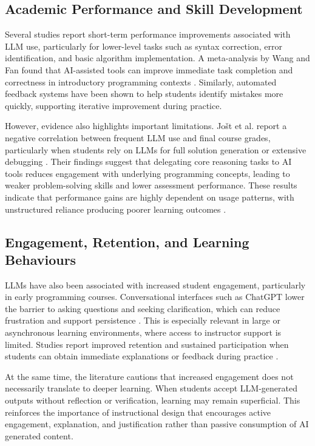 \documentclass[10pt,journal,compsoc]{IEEEtran}
\begin{document}
\subsection{Academic Performance and Skill Development}

Several studies report short-term performance improvements associated with LLM use, particularly for lower-level tasks such as syntax correction, error identification, and basic algorithm implementation. A meta-analysis by Wang and Fan found that AI-assisted tools can improve immediate task completion and correctness in introductory programming contexts \cite{wang2024largelanguagemodelseducation}. Similarly, automated feedback systems have been shown to help students identify mistakes more quickly, supporting iterative improvement during practice.

However, evidence also highlights important limitations. Jošt et al. report a negative correlation between frequent LLM use and final course grades, particularly when students rely on LLMs for full solution generation or extensive debugging \cite{app14104115}. Their findings suggest that delegating core reasoning tasks to AI tools reduces engagement with underlying programming concepts, leading to weaker problem-solving skills and lower assessment performance. These results indicate that performance gains are highly dependent on usage patterns, with unstructured reliance producing poorer learning outcomes \cite{Phung2023}.

\subsection{Engagement, Retention, and Learning Behaviours}

LLMs have also been associated with increased student engagement, particularly in early programming courses. Conversational interfaces such as ChatGPT lower the barrier to asking questions and seeking clarification, which can reduce frustration and support persistence \cite{Deriba2023, Haindl2024}. This is especially relevant in large or asynchronous learning environments, where access to instructor support is limited. Studies report improved retention and sustained participation when students can obtain immediate explanations or feedback during practice \cite{educsci13121216}.

At the same time, the literature cautions that increased engagement does not necessarily translate to deeper learning. When students accept LLM-generated outputs without reflection or verification, learning may remain superficial. This reinforces the importance of instructional design that encourages active engagement, explanation, and justification rather than passive consumption of AI generated content.
\end{document}
